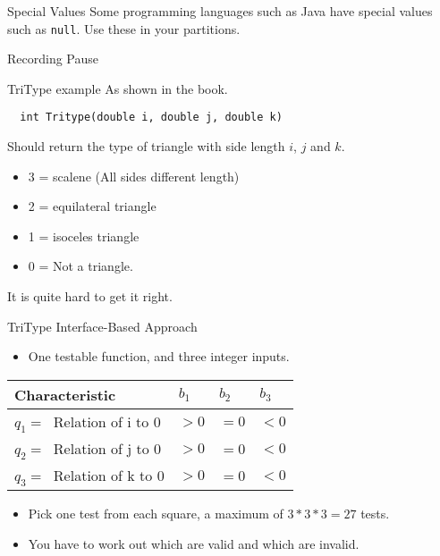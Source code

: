 \documentclass{beamer}
\newcommand{\pauseslide}{\begin{frame}{}
  \begin{center}
    Recording Pause
  \end{center}
  
\end{frame}}
\begin{document}
\begin{frame}{Special Values}
  Some programming languages such as Java have special values such as
  {\tt null}. Use these in your partitions. 
\end{frame}
\pauseslide

\begin{frame}[fragile]{TriType example}
As shown in the book.
  \begin{lstlisting}
  int Tritype(double i, double j, double k)
  \end{lstlisting}
Should return  the type of triangle with side length $i$, $j$ and $k$.
  \begin{itemize}
  \item 3 = scalene (All sides different length)
  \item 2 = equilateral triangle
  \item 1 = isoceles triangle 
  \item 0 = Not a triangle.
  \end{itemize}
It is quite hard to get it right.
\end{frame}
\begin{frame}{TriType Interface-Based Approach}
  \begin{itemize}
  \item One testable function, and three integer inputs.
  \end{itemize}
  \begin{tabular}{||l|l|l|l||}
\hline 
 Characteristic & $b_1$ &  $b_2$ & $b_3$ \\ \hline
 $q_1 = \ $ Relation of i  to $0$ & $>0$ & $=0$ & $<0$ \\
 $q_2 = \ $ Relation of j  to $0$ & $>0$ & $=0$ & $<0$ \\
 $q_3 = \ $ Relation of k  to $0$ & $>0$ & $=0$ & $<0$ \\
\hline    
\end{tabular}
\begin{itemize}
\item Pick one test from each square, a maximum of $3*3*3=27$ tests. 
\item You have to work out which are valid and which are invalid.
\end{itemize}
\end{frame}
\end{document}
